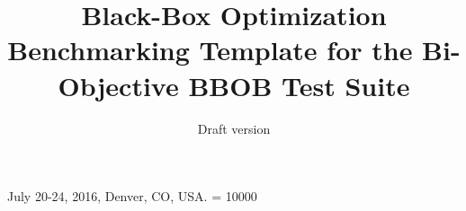\documentclass{sig-alternate}
\begin{document}
%
 {July 20-24, 2016, Denver, CO, USA.}
\widowpenalty = 10000

\title{Black-Box Optimization Benchmarking Template for the Bi-Objective BBOB Test Suite
}
\subtitle{Draft version
}


%
%
%
%
%
\end{document}
